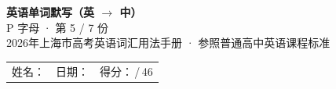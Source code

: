 \documentclass[10pt,a4paper]{article}
\begin{document}
\pagestyle{plain}

\begin{center}
{\LARGE\bfseries 英语单词默写（英 $\to$ 中）}\\[0.22em]
{\large P 字母 · 第 5 / 7 份}\\[0.18em]
{\small 2026年上海市高考英语词汇用法手册 · 参照普通高中英语课程标准}
\end{center}

\vspace{0.25em}
\noindent\begin{tabular}{@{}p{}@{}p{}@{}p{}@{}}
姓名：\underline{\hspace{2.0cm}} & 日期：\underline{\hspace{2.0cm}} & 得分：\underline{\hspace{1.3cm}}\,/\,46 \\
\end{tabular}

\vspace{0.3em}

\vspace{0.08em}
\end{document}

